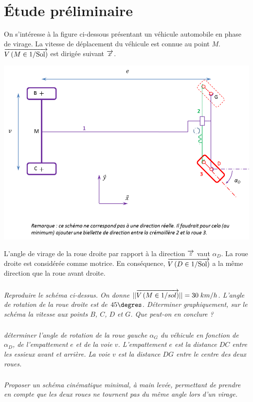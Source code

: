 \documentclass[10pt]{article}
\newif\ifxp
\begin{document}
\ifxp

\else

\fi


\section{Étude préliminaire}

On s'intéresse à la figure ci-dessous présentant un véhicule automobile en phase de virage. La vitesse de déplacement du véhicule est connue au point $M$. $\overrightarrow{V\left( {M} \in {1}/{\text{Sol}}\right)}$ est dirigée suivant $\overrightarrow{x}$.


\begin{center}
\includegraphics[width=.9\textwidth]{images/voiture}
\end{center}

L'angle de virage de la roue droite par rapport à la direction $\overrightarrow{z}$ vaut $\alpha_D$. La roue droite est considérée comme motrice. En conséquence, $\overrightarrow{V\left( {D} \in {1}/{\text{Sol}}\right)}$ a la même direction que la roue avant droite. 

\subparagraph{}
\textit{Reproduire le schéma ci-dessus. On donne $||\overrightarrow{V\left( {M} \in {1}/{sol}\right)}||=30\; km/h$. L'angle de rotation de la roue droite est de $45\degres$. Déterminer graphiquement, sur le schéma la vitesse aux points $B$, $C$, $D$ et $G$. Que peut-on en conclure ?}

\subparagraph{}
\textit{déterminer l'angle de rotation de la roue gauche $\alpha_G$ du véhicule en fonction de $\alpha_D$, de l'empattement $e$ et de la voie $v$. L'empattement $e$ est la distance $DC$ entre les essieux avant et arrière. La voie $v$ est la distance $DG$ entre le centre des deux roues.}



\subparagraph{}
\textit{Proposer un schéma cinématique minimal, à main levée, permettant de prendre en compte que les deux roues ne tournent pas du même angle lors d'un virage. }
\end{document}
